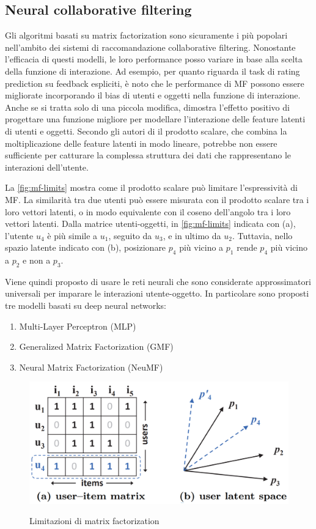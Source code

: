 \subsection{Neural collaborative filtering} \label{sec:ncf}
Gli algoritmi basati su matrix factorization sono sicuramente i più popolari nell'ambito dei sistemi di raccomandazione collaborative filtering. Nonostante l'efficacia di questi modelli, le loro performance  posso variare in base alla scelta della funzione di interazione. Ad esempio, per quanto riguarda il task di rating prediction su feedback espliciti, è noto che le performance di MF possono essere migliorate incorporando il bias di utenti e oggetti nella funzione di interazione. Anche se si tratta solo di una piccola modifica, dimostra l'effetto positivo di progettare una funzione migliore per modellare l'interazione delle feature latenti di utenti e oggetti. 
Secondo gli autori di \cite{NCF} il prodotto scalare, che combina la moltiplicazione delle feature latenti in modo lineare, potrebbe non essere sufficiente per catturare la complessa struttura dei dati che rappresentano le interazioni dell'utente. 

La \autoref{fig:mf-limits} mostra come il prodotto scalare può limitare l'espressività di MF. La similarità tra due utenti può essere misurata con il prodotto scalare tra i loro vettori latenti, o in modo equivalente con il coseno dell'angolo tra i loro vettori latenti. Dalla matrice utenti-oggetti, in \autoref{fig:mf-limits} indicata con (a), l'utente $u_4$ è più simile a $u_1$, seguito da $u_3$, e in ultimo da $u_2$. Tuttavia, nello spazio latente indicato con (b), posizionare $p_4$ più vicino a $p_1$ rende $p_4$ più vicino a $p_2$ e non a $p_3$.

Viene quindi proposto di usare le reti neurali che sono considerate approssimatori universali \cite{NN-universal-approx} per imparare le interazioni utente-oggetto. In particolare sono proposti tre modelli basati su deep neural networks:
\begin{enumerate}
 \item Multi-Layer Perceptron (MLP)
 \item Generalized Matrix Factorization (GMF)
 \item Neural Matrix Factorization (NeuMF)
\end{enumerate}

\begin{figure}
  \centering
  \includegraphics[scale=0.50]{immagini/user_item_vectors.png}
  \caption{Limitazioni di matrix factorization}
  \cite{NCF}
  \label{fig:mf-limits}
\end{figure}

